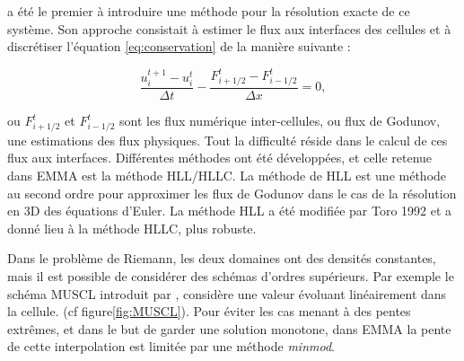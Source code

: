 %
%
%

\cite{MR0119433} a été le premier à introduire une méthode pour la résolution exacte de ce système.
Son approche consistait à estimer le flux aux interfaces des cellules et à discrétiser l'équation \ref{eq:conservation} de la manière suivante : 

\begin{equation}
\frac{ u^{t+1}_i - u^t_i }{\Delta t} - \frac{ F^t_{i+1/2} - F^t_{i-1/2} }{\Delta x} =0,
\label{eq:rad_solver}
\end{equation}

ou $F^t_{i+1/2}$ et $F^t_{i-1/2}$ sont les flux numérique inter-cellules, ou flux de Godunov, une estimations des flux physiques.
Tout la difficulté réside dans le calcul de ces flux aux interfaces. %
Différentes méthodes ont été développées, et celle retenue dans EMMA est la méthode HLL/HLLC.
La méthode de \ac{HLL} est une méthode au second ordre pour approximer les flux de Godunov dans le cas de la résolution en 3D des équations d'Euler.
La méthode \ac{HLL} a été modifiée par Toro 1992 et a donné lieu à la méthode HLLC, plus robuste.

Dans le problème de Riemann, les deux domaines ont des densités constantes, mais il est possible de considérer des schémas d'ordres supérieurs.
Par exemple le schéma \ac{MUSCL} introduit par \cite{1979JCoPh..32..101V},  considère une valeur évoluant linéairement dans la cellule. (cf figure\ref{fig:MUSCL}).
Pour éviter les cas menant à des pentes extrêmes, et dans le but de garder une solution monotone, dans EMMA la pente de cette interpolation est limitée par une méthode \textit{minmod}.

